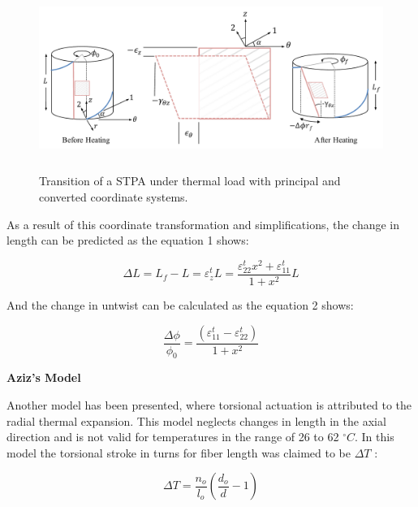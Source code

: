 \documentclass[12pt,oneside]{article}
\begin{document}
\begin{figure}[H]
\centering	
	\includegraphics[width=15cm,height=6cm, angle=0]{elemental_diagram_2.pdf}
	
\caption{Transition of a STPA under thermal load with principal and converted coordinate systems.}\label{fig:aaa}
\end{figure}	
	 	
	
	As a result of this coordinate transformation and simplifications, the change in length can be predicted as the equation 1 shows:
	
	\begin{equation}
\Delta L = L_f - L = \varepsilon^t_{z} L = \frac{\varepsilon^{t}_{22} x^2 + \varepsilon^{t}_{11}}{1+x^2} L
\label{eq:DL}
\end{equation} 	

 And the change in untwist can be calculated as the equation 2 shows:
 
 \begin{equation}
\frac{\Delta \phi}{\phi_0} = \frac{(\varepsilon^{t}_{11}-\varepsilon^{t}_{22})}{1+x^2}
\label{eq:Dphi}
\end{equation} 	
 	
\hspace{0.5cm}\textbf{Aziz's Model}\\ \par

Another model has been presented, where torsional actuation is attributed to the radial thermal expansion. This model neglects changes in length in the axial direction and is not valid for temperatures in the range of 26 to 62 $^\circ C$. In this model the torsional stroke in turns for fiber length was claimed to be $\Delta T$ :

 \begin{equation}
 \Delta T = \frac{n_o}{l_o}(\frac{d_o}{d}-1)
\label{eq:aziz_mod_T}
\end{equation}
\end{document}
